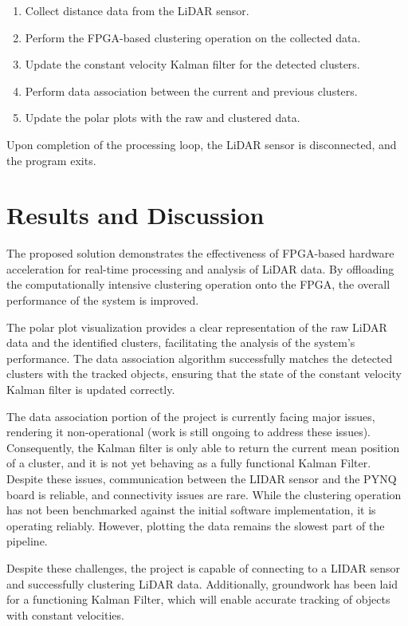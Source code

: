 \documentclass[journal]{IEEEtran} %
\begin{document}
\begin{enumerate}
\item Collect distance data from the LiDAR sensor.
\item Perform the FPGA-based clustering operation on the collected data.
\item Update the constant velocity Kalman filter for the detected clusters.
\item Perform data association between the current and previous clusters.
\item Update the polar plots with the raw and clustered data.
\end{enumerate}

Upon completion of the processing loop, the LiDAR sensor is disconnected, and the program exits.


\section{Results and Discussion}

The proposed solution demonstrates the effectiveness of FPGA-based hardware acceleration for real-time processing and analysis of LiDAR data. By offloading the computationally intensive clustering operation onto the FPGA, the overall performance of the system is improved.

The polar plot visualization provides a clear representation of the raw LiDAR data and the identified clusters, facilitating the analysis of the system's performance. The data association algorithm successfully matches the detected clusters with the tracked objects, ensuring that the state of the constant velocity Kalman filter is updated correctly.

The data association portion of the project is currently facing major issues, rendering it non-operational (work is still ongoing to address these issues). Consequently, the Kalman filter is only able to return the current mean position of a cluster, and it is not yet behaving as a fully functional Kalman Filter. Despite these issues, communication between the LIDAR sensor and the PYNQ board is reliable, and connectivity issues are rare. While the clustering operation has not been benchmarked against the initial software implementation, it is operating reliably. However, plotting the data remains the slowest part of the pipeline.

Despite these challenges, the project is capable of connecting to a LIDAR sensor and successfully clustering LiDAR data. Additionally, groundwork has been laid for a functioning Kalman Filter, which will enable accurate tracking of objects with constant velocities.
\end{document}
